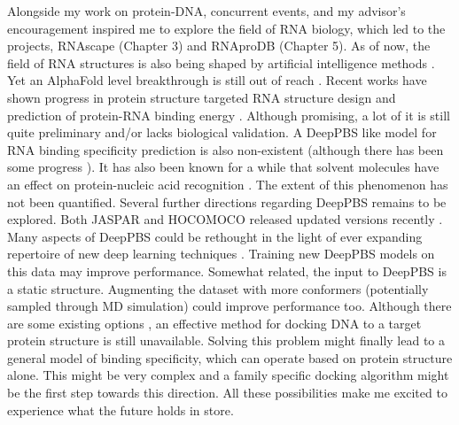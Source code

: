 Alongside my work on protein-DNA, concurrent events, and my advisor's encouragement inspired me to explore the field of RNA biology, which led to the projects, RNAscape (Chapter 3) and RNAproDB (Chapter 5). As of now, the field of RNA structures is also being shaped by artificial intelligence methods \citep{he2024ribonanza}. Yet an AlphaFold level breakthrough is still out of reach \citep{schneider2023will}. Recent works have shown progress in protein structure targeted RNA structure design \citep{nori2024rnaflow} and prediction of protein-RNA binding energy \citep{han2024copra}. Although promising, a lot of it is still quite preliminary and/or lacks biological validation. A DeepPBS like model for RNA binding specificity prediction is also non-existent (although there has been some progress \citep{Lam2019}). It has also been known for a while that solvent molecules have an effect on protein-nucleic acid recognition \citep{Otwinowski1988}. The extent of this phenomenon has not been quantified. Several further directions regarding DeepPBS remains to be explored. Both JASPAR and HOCOMOCO released updated versions recently \citep{Rauluseviciute2024,vorontsov2024hocomoco}. Many aspects of DeepPBS could be rethought in the light of ever expanding repertoire of new deep learning techniques \citep{ho2020denoising, anand2022protein}. Training new DeepPBS models on this data may improve performance. Somewhat related, the input to DeepPBS is a static structure. Augmenting the dataset with more conformers (potentially sampled through MD simulation) could improve performance too. Although there are some existing options \citep{van2006information}, an effective method for docking DNA to a target protein structure is still unavailable. Solving this problem might finally lead to a general model of binding specificity, which can operate based on protein structure alone. This might be very complex and a family specific docking algorithm might be the first step towards this direction. All these possibilities make me excited to experience what the future holds in store.

